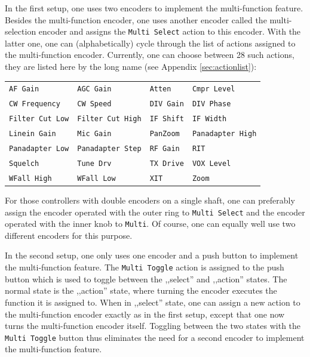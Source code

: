 \documentclass[12pt]{book}
\def\bltt#1{\texttt{\color{blue}#1}}
\begin{document}
In the first setup, one uses two encoders to implement the multi-function feature. Besides the multi-function
encoder, one uses another encoder called the multi-selection encoder and assigns
the \bltt{Multi Select} action to this encoder. With the latter one, one can
(alphabetically) cycle
through the list of actions assigned to the multi-function encoder. Currently, one can choose between
28 such actions, they are listed here by the long name (see Appendix \ref{sec:actionlist}):

\begin{center}
\begin{tabular}{llll}
\bltt{AF Gain}         & \bltt{AGC Gain} & \bltt{Atten}       & \bltt{Cmpr Level}     \\
\bltt{CW Frequency} & \bltt{CW Speed}        & \bltt{DIV Gain} & \bltt{DIV Phase}  \\
\bltt{Filter Cut Low} & \bltt{Filter Cut High} & \bltt{IF Shift}        & \bltt{IF Width} \\
\bltt{Linein Gain} & \bltt{Mic Gain}       & \bltt{PanZoom} & \bltt{Panadapter High} \\
\bltt{Panadapter Low} & \bltt{Panadapter Step} & \bltt{RF Gain} & \bltt{RIT} \\
\bltt{Squelch} & \bltt{Tune Drv} & \bltt{TX Drive} & \bltt{VOX Level}  \\
\bltt{WFall High} & \bltt{WFall Low} & \bltt{XIT} & \bltt{Zoom}
\end{tabular}
\end{center}

For those controllers with double encoders on a single shaft, one can preferably assign the encoder
operated with the outer ring  to \bltt{Multi Select} and the encoder operated with the inner
knob to \bltt{Multi}. Of course, one can equally well use two different encoders for this purpose.

In the second setup, one only uses one encoder and a push button to implement the multi-function
feature. The \bltt{Multi Toggle} action is assigned to the push button which is used to toggle
between the ,,select'' and ,,action'' states. The normal state is the ,,action'' state, where
turning the encoder executes the function it is assigned to. When in ,,select'' state, one can
assign a new action to the multi-function encoder exactly as in the first setup, except that
one now turns the multi-function encoder itself. Toggling between the
two states with the \bltt{Multi Toggle} button
thus eliminates the need for a second encoder to implement the multi-function feature.
\end{document}
